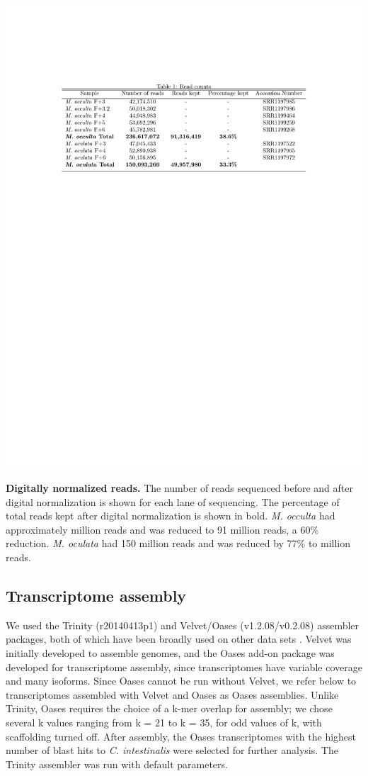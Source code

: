 \begin{table}[ht]
\centering
\includegraphics[scale=1.0]{manuscript/Table1.pdf}
\caption{\textbf{Digitally normalized reads.} The number of reads sequenced before and after digital normalization is shown for each lane of sequencing. The percentage of total reads kept after digital normalization is shown in bold. \textit{M. occulta} had approximately  million reads and was reduced to 91 million reads, a 60\% reduction. \textit{M. oculata} had 150 million reads and was reduced by 77\% to  million reads. }
\label{table:Table1.pdf}
\end{table}

\subsection{Transcriptome assembly}
We used the Trinity (r20140413p1) and Velvet/Oases (v1.2.08/v0.2.08) assembler packages, both of which have been broadly used on other data sets \citep{vijay_challenges_2012,grabherr_full-length_2011,schulz_oases:_2012}.  Velvet was initially developed to assemble genomes, and the Oases add-on package was developed for transcriptome assembly, since transcriptomes have variable coverage and many isoforms.  Since Oases cannot be run without Velvet, we refer below to transcriptomes assembled with Velvet and Oases as Oases assemblies. Unlike Trinity, Oases requires the choice of a k-mer overlap for assembly; we chose several k values ranging from k = 21 to k = 35, for odd values of k, with scaffolding turned off. After assembly, the Oases transcriptomes with the highest number of blast hits to \textit{C. intestinalis} were selected for further analysis. The Trinity assembler was run with default parameters.

